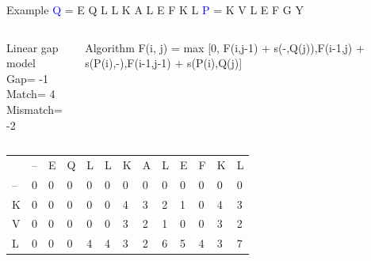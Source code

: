 \documentclass{bredelebeamer}
\begin{document}
 \begin{frame}{Example}
 \centering
 \textcolor{blue}{Q} = E Q L L K A L E F K L \quad \textcolor{blue}{P} = K V L E F G Y
\begin{columns}
\begin{block}{Linear gap model} \\
Gap= -1 \\
Match= 4 \\
Mismatch= -2
\end{block}
\begin{block}{Algorithm}
 F(i, j) =  max [0, F(i,j-1) + s(-,Q(j)),F(i-1,j) + s(P(i),-),F(i-1,j-1) + s(P(i),Q(j)]
\end{block}
\end{columns}
     \begin{table}[]
\centering
\begin{tabular}{*{13}{p{0.4cm}}}
                        & --                     & E                      & Q                      & L                      & L                      & K                      & A                      & L                      & E                       & F                       & K                       & L                       \\ \cline{2-13} 
\multicolumn{1}{l|}{--} & \multicolumn{1}{l|}{0} & \multicolumn{1}{l|}{0} & \multicolumn{1}{l|}{0} & \multicolumn{1}{l|}{0} & \multicolumn{1}{l|}{0} & \multicolumn{1}{l|}{0} & \multicolumn{1}{l|}{0} & \multicolumn{1}{l|}{0} & \multicolumn{1}{l|}{0}  & \multicolumn{1}{l|}{0}  & \multicolumn{1}{l|}{0}  & \multicolumn{1}{l|}{0}  \\ \cline{2-13} 
\multicolumn{1}{l|}{K}  & \multicolumn{1}{l|}{0} & \multicolumn{1}{l|}{0} & \multicolumn{1}{l|}{0} & \multicolumn{1}{l|}{0} & \multicolumn{1}{l|}{0} & \multicolumn{1}{l|}{4} & \multicolumn{1}{l|}{3} & \multicolumn{1}{l|}{2} & \multicolumn{1}{l|}{1}  & \multicolumn{1}{l|}{0}  & \multicolumn{1}{l|}{4}  & \multicolumn{1}{l|}{3}  \\ \cline{2-13} 
\multicolumn{1}{l|}{V}  & \multicolumn{1}{l|}{0} & \multicolumn{1}{l|}{0} & \multicolumn{1}{l|}{0} & \multicolumn{1}{l|}{0} & \multicolumn{1}{l|}{0} & \multicolumn{1}{l|}{3} & \multicolumn{1}{l|}{2} & \multicolumn{1}{l|}{1} & \multicolumn{1}{l|}{0}  & \multicolumn{1}{l|}{0}  & \multicolumn{1}{l|}{3}  & \multicolumn{1}{l|}{2}  \\ \cline{2-13} 
\multicolumn{1}{l|}{L}  & \multicolumn{1}{l|}{0} & \multicolumn{1}{l|}{0} & \multicolumn{1}{l|}{0} & \multicolumn{1}{l|}{4} & \multicolumn{1}{l|}{4} & \multicolumn{1}{l|}{3} & \multicolumn{1}{l|}{2} & \multicolumn{1}{l|}{6} & \multicolumn{1}{l|}{5}  & \multicolumn{1}{l|}{4}  & \multicolumn{1}{l|}{3}  &     \multicolumn{1}{l|}{7}  \\ \cline{2-13}  %

\end{tabular}
\end{table}
\end{frame}
\end{document}
